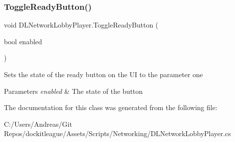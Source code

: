 \subsubsection{\texorpdfstring{Toggle\+Ready\+Button()}{ToggleReadyButton()}}
{\footnotesize\ttfamily void D\+L\+Network\+Lobby\+Player.\+Toggle\+Ready\+Button (\begin{DoxyParamCaption}\item[{bool}]{enabled }\end{DoxyParamCaption})}



Sets the state of the ready button on the UI to the parameter one 


\begin{DoxyParams}{Parameters}
{\em enabled} & The state of the button\\
\hline
\end{DoxyParams}


The documentation for this class was generated from the following file\+:\begin{DoxyCompactItemize}
\item 
C\+:/\+Users/\+Andreas/\+Git Repos/dockitleague/\+Assets/\+Scripts/\+Networking/D\+L\+Network\+Lobby\+Player.\+cs\end{DoxyCompactItemize}
